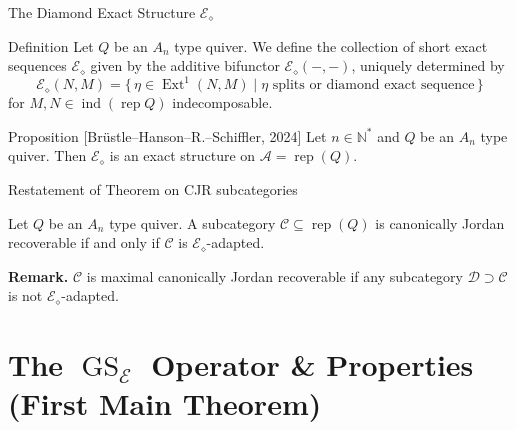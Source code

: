 \documentclass[t]{beamer}
\theoremstyle{plain}
\newcommand{\rep}{\operatorname{rep}}
\newcommand{\ind}{\operatorname{ind}}
\newcommand{\Ext}{\operatorname{Ext}}
\newcommand{\GS}{\operatorname{GS}}
\begin{document}
\begin{frame}{The Diamond Exact Structure \(\mathcal{E}_\diamond\)}

\begin{block}{Definition}
Let \(Q\) be an \(A_n\) type quiver.  
We define the collection of short exact sequences
\(\mathcal{E}_{\diamond}\) given by the additive bifunctor
\(\mathcal{E}_\diamond(-,-)\), uniquely determined by
\[
\mathcal{E}_\diamond(N,M)
= \bigl\{\, \eta \in \Ext^1(N,M) \;\big|\;
\eta \text{ splits or diamond exact sequence}\,\bigr\}
\]
for \(M,N \in \ind(\rep Q)\) indecomposable.
\end{block}

\pause

\begin{block}{Proposition [Brüstle–Hanson–R.–Schiffler, 2024]}
Let \(n \in \mathbb{N}^*\) and \(Q\) be an \(A_n\) type quiver.  
Then \(\mathcal{E}_{\diamond}\) is an exact structure on \(\mathscr{A}=\rep(Q)\).
\end{block}

\end{frame}

\begin{frame}{Restatement of Theorem on CJR subcategories}
\begin{theorem}
Let $Q$ be an $A_n$ type quiver.  
A subcategory $\mathscr{C} \subseteq \rep(Q)$ is canonically Jordan recoverable  
if and only if $\mathscr{C}$ is $\mathcal{E}_\diamond$-adapted.
\end{theorem}

\pause
\bigskip

\textbf{Remark.} 
$\mathscr{C}$ is maximal canonically Jordan recoverable if any subcategory $\mathscr{D}  \supset \mathscr{C}$ is not $\mathcal{E}_\diamond$-adapted.  
\end{frame}

\section{The \texorpdfstring{$\GS_\mathcal{E}$}{GS(E)} Operator \& Properties\\ \normalsize (First Main Theorem)}
\end{document}
